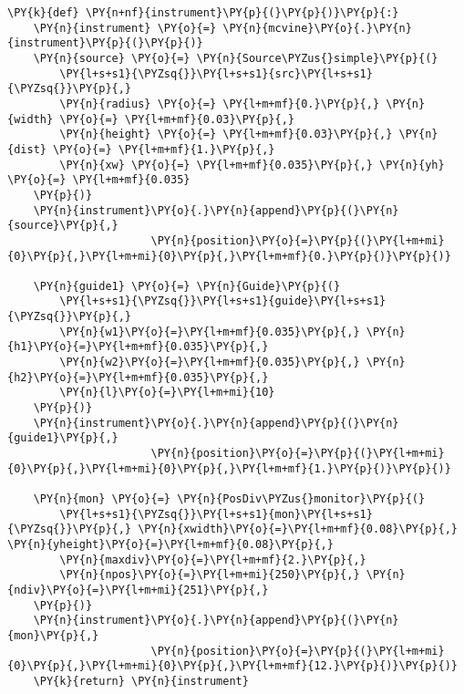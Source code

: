 \begin{Verbatim}[commandchars=\\\{\}]
\PY{k}{def} \PY{n+nf}{instrument}\PY{p}{(}\PY{p}{)}\PY{p}{:}
    \PY{n}{instrument} \PY{o}{=} \PY{n}{mcvine}\PY{o}{.}\PY{n}{instrument}\PY{p}{(}\PY{p}{)}
    \PY{n}{source} \PY{o}{=} \PY{n}{Source\PYZus{}simple}\PY{p}{(}
        \PY{l+s+s1}{\PYZsq{}}\PY{l+s+s1}{src}\PY{l+s+s1}{\PYZsq{}}\PY{p}{,}
        \PY{n}{radius} \PY{o}{=} \PY{l+m+mf}{0.}\PY{p}{,} \PY{n}{width} \PY{o}{=} \PY{l+m+mf}{0.03}\PY{p}{,} 
        \PY{n}{height} \PY{o}{=} \PY{l+m+mf}{0.03}\PY{p}{,} \PY{n}{dist} \PY{o}{=} \PY{l+m+mf}{1.}\PY{p}{,} 
        \PY{n}{xw} \PY{o}{=} \PY{l+m+mf}{0.035}\PY{p}{,} \PY{n}{yh} \PY{o}{=} \PY{l+m+mf}{0.035}
    \PY{p}{)}
    \PY{n}{instrument}\PY{o}{.}\PY{n}{append}\PY{p}{(}\PY{n}{source}\PY{p}{,} 
                      \PY{n}{position}\PY{o}{=}\PY{p}{(}\PY{l+m+mi}{0}\PY{p}{,}\PY{l+m+mi}{0}\PY{p}{,}\PY{l+m+mf}{0.}\PY{p}{)}\PY{p}{)}

    \PY{n}{guide1} \PY{o}{=} \PY{n}{Guide}\PY{p}{(}
        \PY{l+s+s1}{\PYZsq{}}\PY{l+s+s1}{guide}\PY{l+s+s1}{\PYZsq{}}\PY{p}{,}
        \PY{n}{w1}\PY{o}{=}\PY{l+m+mf}{0.035}\PY{p}{,} \PY{n}{h1}\PY{o}{=}\PY{l+m+mf}{0.035}\PY{p}{,} 
        \PY{n}{w2}\PY{o}{=}\PY{l+m+mf}{0.035}\PY{p}{,} \PY{n}{h2}\PY{o}{=}\PY{l+m+mf}{0.035}\PY{p}{,} 
        \PY{n}{l}\PY{o}{=}\PY{l+m+mi}{10}
    \PY{p}{)}
    \PY{n}{instrument}\PY{o}{.}\PY{n}{append}\PY{p}{(}\PY{n}{guide1}\PY{p}{,} 
                      \PY{n}{position}\PY{o}{=}\PY{p}{(}\PY{l+m+mi}{0}\PY{p}{,}\PY{l+m+mi}{0}\PY{p}{,}\PY{l+m+mf}{1.}\PY{p}{)}\PY{p}{)}

    \PY{n}{mon} \PY{o}{=} \PY{n}{PosDiv\PYZus{}monitor}\PY{p}{(}
        \PY{l+s+s1}{\PYZsq{}}\PY{l+s+s1}{mon}\PY{l+s+s1}{\PYZsq{}}\PY{p}{,} \PY{n}{xwidth}\PY{o}{=}\PY{l+m+mf}{0.08}\PY{p}{,} \PY{n}{yheight}\PY{o}{=}\PY{l+m+mf}{0.08}\PY{p}{,}
        \PY{n}{maxdiv}\PY{o}{=}\PY{l+m+mf}{2.}\PY{p}{,}
        \PY{n}{npos}\PY{o}{=}\PY{l+m+mi}{250}\PY{p}{,} \PY{n}{ndiv}\PY{o}{=}\PY{l+m+mi}{251}\PY{p}{,}
    \PY{p}{)}
    \PY{n}{instrument}\PY{o}{.}\PY{n}{append}\PY{p}{(}\PY{n}{mon}\PY{p}{,} 
                      \PY{n}{position}\PY{o}{=}\PY{p}{(}\PY{l+m+mi}{0}\PY{p}{,}\PY{l+m+mi}{0}\PY{p}{,}\PY{l+m+mf}{12.}\PY{p}{)}\PY{p}{)}
    \PY{k}{return} \PY{n}{instrument}
\end{Verbatim}
